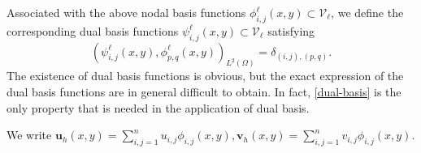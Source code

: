 Associated with the above nodal basis functions $\phi^{\ell}_{i,j}(x,y)\subset \mathcal V_{\ell}$, 
we define the corresponding dual basis functions $\psi^{\ell}_{i,j}(x,y)\subset \mathcal V_{\ell}$ 
satisfying 
\begin{equation}
  \label{dual-basis}
(\psi^{\ell}_{i,j}(x,y), \phi^{\ell}_{p,q}(x,y))_{L^2(\Omega)}=\delta_{(i,j), (p,q)}.
\end{equation}
The existence of dual basis functions is obvious, but the exact expression of the dual basis functions are  
in general difficult to obtain. In fact, \eqref{dual-basis} is the only property that is needed in the application 
of dual basis. 

We write $\mathbf u_h(x,y)=\sum\limits_{i,j=1}^{n} u_{i,j}\phi_{i,j}(x,y), \mathbf v_h(x,y)=\sum\limits_{i,j=1}^{n} v_{i,j}\phi_{i,j}(x,y)$. 

